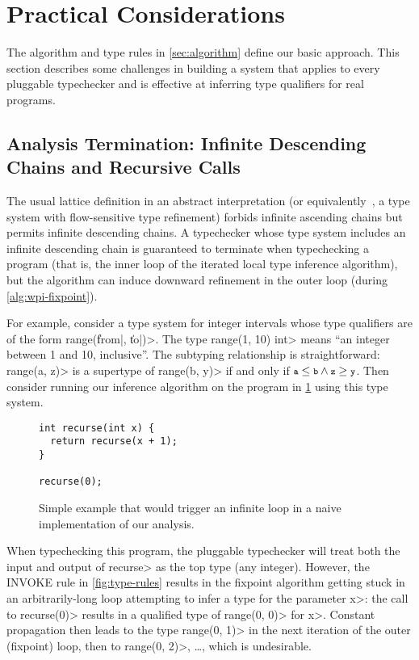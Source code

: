 \section{Practical Considerations}
\label{sec:difficulties}

The algorithm and type rules in \cref{sec:algorithm} define our
basic approach. This section describes some challenges
in building a system that applies
to every pluggable typechecker and is effective at inferring
type qualifiers for real programs.


\subsection{Analysis Termination: Infinite Descending Chains and Recursive Calls}
\label{sec:infinite-descending-chains}

The usual lattice definition in an abstract interpretation
(or equivalently~\cite{Cousot1997}, a type system with flow-sensitive type
refinement) forbids
infinite ascending chains but permits infinite descending chains.
A typechecker whose type system includes an infinite descending chain
is guaranteed to terminate when typechecking a program (that is, the inner
loop of the iterated local type inference algorithm), but the
algorithm can induce downward refinement in the outer loop
(\ie during \cref{alg:wpi-fixpoint}).

For example, consider a type system for integer intervals
whose type qualifiers are of the form \<range(\|from|, \|to|)>.
The type \<range(1, 10) int> means ``an integer between
1 and 10, inclusive''.
The subtyping relationship is straightforward: \<range(a, z)>
is a supertype of \<range(b, y)> if and only if $\<a> \le \<b> \wedge \<z>
\ge \<y>$.
Then consider running our inference algorithm on the program in \cref{fig:descend}
using this type system.

\begin{figure}
\begin{verbatim}
int recurse(int x) {
  return recurse(x + 1);
}

recurse(0);
\end{verbatim}
\caption{Simple example that would trigger an infinite loop in a naive
  implementation of our analysis.}
\label{fig:descend}
\end{figure}

When typechecking this program, the pluggable typechecker will
treat both the input and output of \<recurse> as the top type
(\ie any integer). However, the \textsc{INVOKE} rule in \cref{fig:type-rules}
results in the fixpoint algorithm getting stuck in an arbitrarily-long
loop attempting to infer a type for the parameter \<x>: the call to \<recurse(0)>
results in a qualified type of \<range(0, 0)> for \<x>. Constant
propagation then leads to the type \<range(0, 1)> in the next iteration
of the outer (fixpoint) loop, then to \<range(0, 2)>, \ldots, which
is undesirable.

